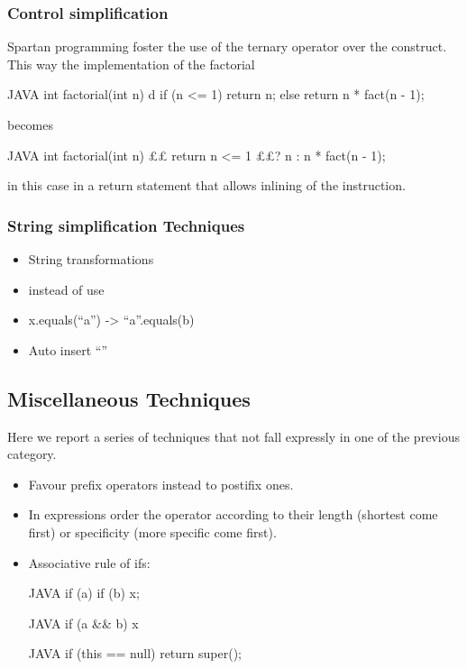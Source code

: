 \subsubsection{Control simplification}
Spartan programming foster the use of the ternary operator over the  construct.
This way the implementation of the factorial
\begin{code}{JAVA}
int factorial(int n) {d
    if (n <= 1)
        return n;
    else
        return n * fact(n - 1);
}
\end{code}
becomes
\begin{code}{JAVA}
int factorial(int n) {££
    return n <= 1 ££? n : n * fact(n - 1);
}
\end{code}

in this case in a return statement that allows inlining of the instruction.

\subsubsection{String simplification Techniques}
\begin{itemize}
 \item String transformations
 \item instead of  use 
 \item x.equals(“a”) -> “a”.equals(b)
 \item Auto insert “”
\end{itemize}

\subsection{Miscellaneous Techniques}

Here we report a series of techniques that not fall expressly in one of the
previous category.

\begin{itemize}
\item Favour prefix operators instead to postifix ones.
\item In expressions order the operator according to their length (shortest come first)
or specificity (more specific come first).

\item Associative rule of ifs:
  \begin{code}{JAVA}
if (a) if (b) x;
\end{code}
  \begin{code}{JAVA}
if (a && b) x
  \end{code}
\begin{code}{JAVA}
if (this == null) return super();
\end{code}

\end{itemize}

